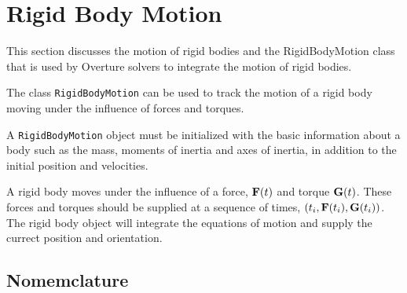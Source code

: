 
\section{Rigid Body Motion}\label{sec:rigidBodyMotion}

  This section discusses the motion of rigid bodies and the RigidBodyMotion class
that is used by Overture solvers to integrate the motion of rigid bodies.

The class {\tt RigidBodyMotion} can be used to track the motion
of a rigid body moving under the influence of forces and torques.

A {\tt RigidBodyMotion} object must be initialized with the basic
information about a body such as the mass, moments of inertia and
axes of inertia, in addition to the initial position and velocities.

A rigid body moves under the influence of a force, $\mathbf{ F}(t)$ and torque $\mathbf{ G}(t)$.
These forces and torques should be supplied at a sequence of times,
$(t_i,\mathbf{ F}(t_i),\mathbf{ G}(t_i))$. The rigid body object will integrate the equations
of motion and supply the currect position and orientation.

\newcommand{\mrb}{m_{b}}%
\newcommand{\xvcm}{\xv_{\rm cm}}%
\newcommand{\vvcm}{\vv_{\rm cm}}%
\newcommand{\avcm}{\av_{\rm cm}}%

\newcommand{\dotxvcm}{\dot\xv_{\rm cm}}%
\newcommand{\dotvvcm}{\dot\vv_{\rm cm}}%

\subsection{Nomemclature}

